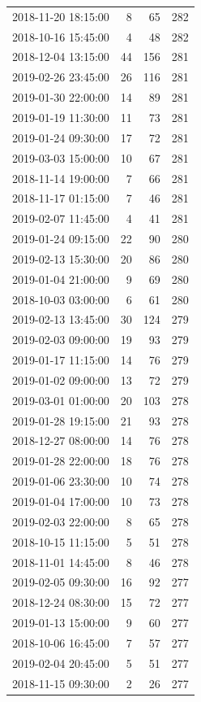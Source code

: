 \begin{tabular}{lrrr}
2018-11-20 18:15:00 & 8 & 65 & 282 \\
2018-10-16 15:45:00 & 4 & 48 & 282 \\
2018-12-04 13:15:00 & 44 & 156 & 281 \\
2019-02-26 23:45:00 & 26 & 116 & 281 \\
2019-01-30 22:00:00 & 14 & 89 & 281 \\
2019-01-19 11:30:00 & 11 & 73 & 281 \\
2019-01-24 09:30:00 & 17 & 72 & 281 \\
2019-03-03 15:00:00 & 10 & 67 & 281 \\
2018-11-14 19:00:00 & 7 & 66 & 281 \\
2018-11-17 01:15:00 & 7 & 46 & 281 \\
2019-02-07 11:45:00 & 4 & 41 & 281 \\
2019-01-24 09:15:00 & 22 & 90 & 280 \\
2019-02-13 15:30:00 & 20 & 86 & 280 \\
2019-01-04 21:00:00 & 9 & 69 & 280 \\
2018-10-03 03:00:00 & 6 & 61 & 280 \\
2019-02-13 13:45:00 & 30 & 124 & 279 \\
2019-02-03 09:00:00 & 19 & 93 & 279 \\
2019-01-17 11:15:00 & 14 & 76 & 279 \\
2019-01-02 09:00:00 & 13 & 72 & 279 \\
2019-03-01 01:00:00 & 20 & 103 & 278 \\
2019-01-28 19:15:00 & 21 & 93 & 278 \\
2018-12-27 08:00:00 & 14 & 76 & 278 \\
2019-01-28 22:00:00 & 18 & 76 & 278 \\
2019-01-06 23:30:00 & 10 & 74 & 278 \\
2019-01-04 17:00:00 & 10 & 73 & 278 \\
2019-02-03 22:00:00 & 8 & 65 & 278 \\
2018-10-15 11:15:00 & 5 & 51 & 278 \\
2018-11-01 14:45:00 & 8 & 46 & 278 \\
2019-02-05 09:30:00 & 16 & 92 & 277 \\
2018-12-24 08:30:00 & 15 & 72 & 277 \\
2019-01-13 15:00:00 & 9 & 60 & 277 \\
2018-10-06 16:45:00 & 7 & 57 & 277 \\
2019-02-04 20:45:00 & 5 & 51 & 277 \\
2018-11-15 09:30:00 & 2 & 26 & 277 \\

\end{tabular}

